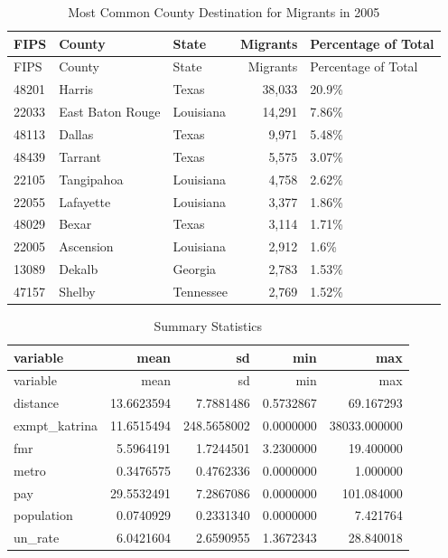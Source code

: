 \documentclass[]{article}
\begin{document}
\begin{longtable}[]{@{}lllrl@{}}
\caption{Most Common County Destination for Migrants in 2005
\label{tab:commondest}}\tabularnewline
\toprule
FIPS & County & State & Migrants & Percentage of Total\tabularnewline
\midrule
\endfirsthead
\toprule
FIPS & County & State & Migrants & Percentage of Total\tabularnewline
\midrule
\endhead
48201 & Harris & Texas & 38,033 & 20.9\%\tabularnewline
22033 & East Baton Rouge & Louisiana & 14,291 & 7.86\%\tabularnewline
48113 & Dallas & Texas & 9,971 & 5.48\%\tabularnewline
48439 & Tarrant & Texas & 5,575 & 3.07\%\tabularnewline
22105 & Tangipahoa & Louisiana & 4,758 & 2.62\%\tabularnewline
22055 & Lafayette & Louisiana & 3,377 & 1.86\%\tabularnewline
48029 & Bexar & Texas & 3,114 & 1.71\%\tabularnewline
22005 & Ascension & Louisiana & 2,912 & 1.6\%\tabularnewline
13089 & Dekalb & Georgia & 2,783 & 1.53\%\tabularnewline
47157 & Shelby & Tennessee & 2,769 & 1.52\%\tabularnewline
\bottomrule
\end{longtable}

\clearpage

\begin{longtable}[]{@{}lrrrr@{}}
\caption{Summary Statistics \label{tab:sumstats}}\tabularnewline
\toprule
variable & mean & sd & min & max\tabularnewline
\midrule
\endfirsthead
\toprule
variable & mean & sd & min & max\tabularnewline
\midrule
\endhead
distance & 13.6623594 & 7.7881486 & 0.5732867 & 69.167293\tabularnewline
exmpt\_katrina & 11.6515494 & 248.5658002 & 0.0000000 &
38033.000000\tabularnewline
fmr & 5.5964191 & 1.7244501 & 3.2300000 & 19.400000\tabularnewline
metro & 0.3476575 & 0.4762336 & 0.0000000 & 1.000000\tabularnewline
pay & 29.5532491 & 7.2867086 & 0.0000000 & 101.084000\tabularnewline
population & 0.0740929 & 0.2331340 & 0.0000000 & 7.421764\tabularnewline
un\_rate & 6.0421604 & 2.6590955 & 1.3672343 & 28.840018\tabularnewline
\bottomrule
\end{longtable}

\clearpage

\clearpage
\scriptsize
\end{document}
